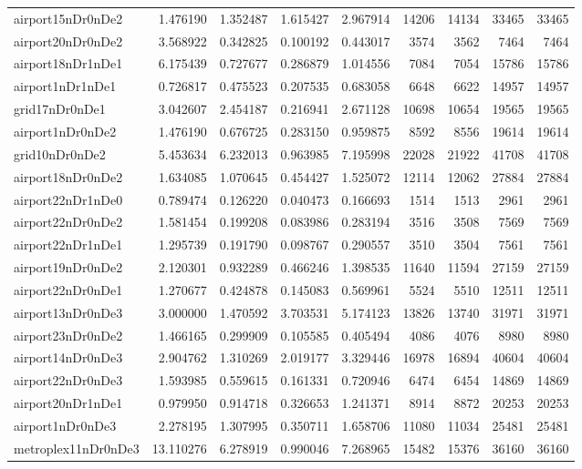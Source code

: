 \begin{longtable}{|l|r|r|r|r|r|r|r|r|}
airport15nDr0nDe2 & 1.476190 & 1.352487 & 1.615427 & 2.967914 & 14206 & 14134 & 33465 & 33465 \\
airport20nDr0nDe2 & 3.568922 & 0.342825 & 0.100192 & 0.443017 & 3574 & 3562 & 7464 & 7464 \\
airport18nDr1nDe1 & 6.175439 & 0.727677 & 0.286879 & 1.014556 & 7084 & 7054 & 15786 & 15786 \\
airport1nDr1nDe1 & 0.726817 & 0.475523 & 0.207535 & 0.683058 & 6648 & 6622 & 14957 & 14957 \\
grid17nDr0nDe1 & 3.042607 & 2.454187 & 0.216941 & 2.671128 & 10698 & 10654 & 19565 & 19565 \\
airport1nDr0nDe2 & 1.476190 & 0.676725 & 0.283150 & 0.959875 & 8592 & 8556 & 19614 & 19614 \\
grid10nDr0nDe2 & 5.453634 & 6.232013 & 0.963985 & 7.195998 & 22028 & 21922 & 41708 & 41708 \\
airport18nDr0nDe2 & 1.634085 & 1.070645 & 0.454427 & 1.525072 & 12114 & 12062 & 27884 & 27884 \\
airport22nDr1nDe0 & 0.789474 & 0.126220 & 0.040473 & 0.166693 & 1514 & 1513 & 2961 & 2961 \\
airport22nDr0nDe2 & 1.581454 & 0.199208 & 0.083986 & 0.283194 & 3516 & 3508 & 7569 & 7569 \\
airport22nDr1nDe1 & 1.295739 & 0.191790 & 0.098767 & 0.290557 & 3510 & 3504 & 7561 & 7561 \\
airport19nDr0nDe2 & 2.120301 & 0.932289 & 0.466246 & 1.398535 & 11640 & 11594 & 27159 & 27159 \\
airport22nDr0nDe1 & 1.270677 & 0.424878 & 0.145083 & 0.569961 & 5524 & 5510 & 12511 & 12511 \\
airport13nDr0nDe3 & 3.000000 & 1.470592 & 3.703531 & 5.174123 & 13826 & 13740 & 31971 & 31971 \\
airport23nDr0nDe2 & 1.466165 & 0.299909 & 0.105585 & 0.405494 & 4086 & 4076 & 8980 & 8980 \\
airport14nDr0nDe3 & 2.904762 & 1.310269 & 2.019177 & 3.329446 & 16978 & 16894 & 40604 & 40604 \\
airport22nDr0nDe3 & 1.593985 & 0.559615 & 0.161331 & 0.720946 & 6474 & 6454 & 14869 & 14869 \\
airport20nDr1nDe1 & 0.979950 & 0.914718 & 0.326653 & 1.241371 & 8914 & 8872 & 20253 & 20253 \\
airport1nDr0nDe3 & 2.278195 & 1.307995 & 0.350711 & 1.658706 & 11080 & 11034 & 25481 & 25481 \\
metroplex11nDr0nDe3 & 13.110276 & 6.278919 & 0.990046 & 7.268965 & 15482 & 15376 & 36160 & 36160 \\

\end{longtable}

